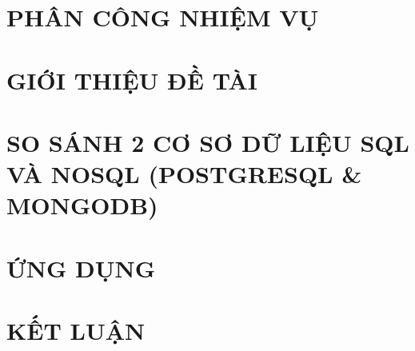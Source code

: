 \newpage
\section*{PHÂN CÔNG NHIỆM VỤ}


\newpage
\section{GIỚI THIỆU ĐỀ TÀI}

\newpage
\section{SO SÁNH 2 CƠ SƠ DỮ LIỆU SQL VÀ NOSQL (POSTGRESQL \& MONGODB)}






\newpage
\section{ỨNG DỤNG}

















\newpage


\section{KẾT LUẬN}
